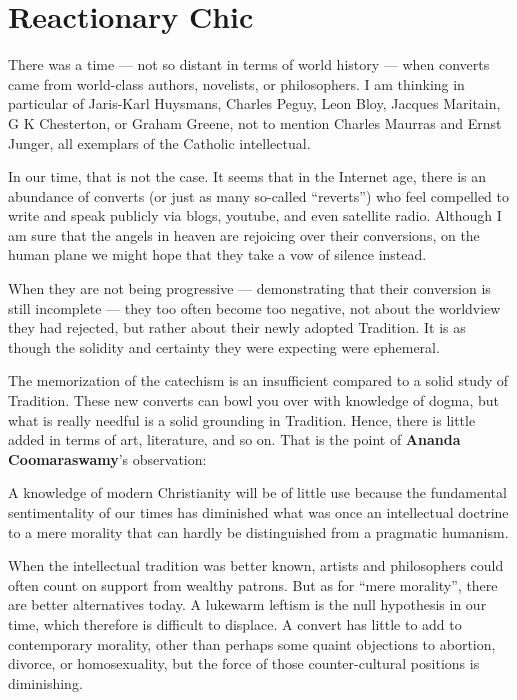 \section{Reactionary Chic}

There was a time --- not so distant in terms of world history --- when converts came from world-class authors, novelists, or philosophers. I am thinking in particular of Jaris-Karl Huysmans, Charles Peguy, Leon Bloy, Jacques Maritain, G K Chesterton, or Graham Greene, not to mention Charles Maurras and Ernst Junger, all exemplars of the Catholic intellectual.

In our time, that is not the case. It seems that in the Internet age, there is an abundance of converts (or just as many so-called ``reverts'') who feel compelled to write and speak publicly via blogs, youtube, and even satellite radio. Although I am sure that the angels in heaven are rejoicing over their conversions, on the human plane we might hope that they take a vow of silence instead.

When they are not being progressive --- demonstrating that their conversion is still incomplete --- they too often become too negative, not about the worldview they had rejected, but rather about their newly adopted Tradition. It is as though the solidity and certainty they were expecting were ephemeral.

The memorization of the catechism is an insufficient compared to a solid study of Tradition. These new converts can bowl you over with knowledge of dogma, but what is really needful is a solid grounding in Tradition. Hence, there is little added in terms of art, literature, and so on. That is the point of \textbf{Ananda Coomaraswamy}'s observation:

\begin{quotex}
A knowledge of modern Christianity will be of little use because the fundamental sentimentality of our times has diminished what was once an intellectual doctrine to a mere morality that can hardly be distinguished from a pragmatic humanism.
\end{quotex}


When the intellectual tradition was better known, artists and philosophers could often count on support from wealthy patrons. But as for ``mere morality'', there are better alternatives today. A lukewarm leftism is the null hypothesis in our time, which therefore is difficult to displace. A convert has little to add to contemporary morality, other than perhaps some quaint objections to abortion, divorce, or homosexuality, but the force of those counter-cultural positions is diminishing.

